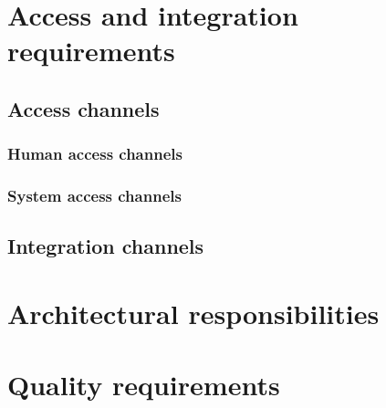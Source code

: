 \documentclass[a4paper,12pt,titlepage]{article}
\begin{document}
\newpage
\setlength{\voffset}{-3cm}

\section{Access and integration requirements}
\subsection{Access channels}
\subsubsection{Human access channels} %
\subsubsection{System access channels}%


\subsection{Integration channels}

\pagebreak
\section{Architectural responsibilities}

\pagebreak
\section{Quality requirements}
\end{document}
